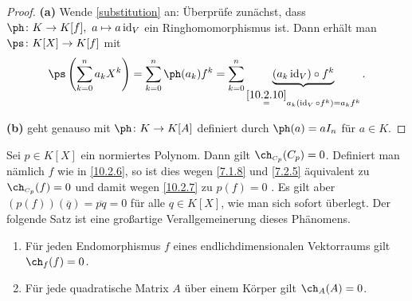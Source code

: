 \documentclass[../../main.tex]{subfiles}
\begin{document}
\begin{proof}
\textbf{(a)} Wende \ref{substitution} an: Überprüfe zunächst, dass $\ph\colon K\to K[f],\ a\mapsto a\id_V$ ein Ringhomomorphismus ist. Dann erhält man
$\ps\colon K[X]\to K[f]$ mit
\[\ps\left(\sum_{k=0}^na_kX^k\right)=\sum_{k=0}^n\ph(a_k)f^k=\sum_{k=0}^n\underbrace{(a_k\id_V)\circ f^k}_{\overset{\ref{10.2.10}}=a_k(\id_V\circ f^k)=a_kf^k}.\]

\medskip\noindent
\textbf{(b)} geht genauso mit $\ph\colon K\to K[A]$ definiert durch $\ph(a)=aI_n$ für $a\in K$.
\end{proof}

\begin{bsp}\label{10.2.13} Sei $p\in K[X]$ ein normiertes Polynom. Dann gilt $\ch_{\scriptscriptstyle C_p}(C_p)=0$. Definiert man nämlich $f$ wie in \ref{10.2.6}, so ist dies wegen \ref{7.1.8} und \ref{7.2.5}
äquivalent zu $\ch_{\scriptscriptstyle C_p}(f)=0$ und damit wegen \ref{10.2.7} zu $p(f)=0$ .
Es gilt aber $(p(f))(\overline q)=\overline{pq}=0$ für alle $q\in K[X]$, wie man sich sofort überlegt. Der folgende Satz ist eine großartige Verallgemeinerung dieses Phänomens.
\end{bsp}

\begin{sat}\label{10.2.14}
\begin{enumerate}[\rm(a)]
\item Für jeden Endomorphismus $f$ eines endlichdimensionalen Vektorraums gilt $\ch_f(f)=0$.
\item Für jede quadratische Matrix $A$ über einem Körper gilt $\ch_A(A)=0$.
\end{enumerate}
\end{sat}
\end{document}
